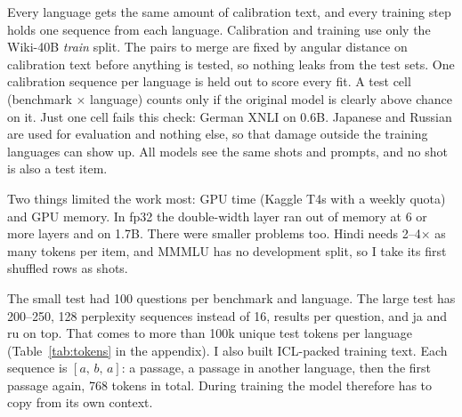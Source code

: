 \documentclass[11pt]{article}
\begin{document}
\begin{table}[t]
\centering\small
{}
\caption{Data. Tests are never used for fitting or choosing anything. MGSM has no Hindi; INCLUDE has no English.}
\label{tab:data}
\end{table}

Every language gets the same amount of calibration text, and every training step holds one sequence from each
language. Calibration and training use only the Wiki-40B \emph{train} split. The pairs to merge are fixed by angular
distance on calibration text before anything is tested, so nothing leaks from the test sets. One calibration
sequence per language is held out to score every fit. A test cell (benchmark $\times$ language) counts only if the
original model is clearly above chance on it. Just one cell fails this check: German XNLI on 0.6B. Japanese and
Russian are used for evaluation and nothing else, so that damage outside the training languages can show up. All
models see the same shots and prompts, and no shot is also a test item.

Two things limited the work most: GPU time (Kaggle T4s with a weekly quota) and GPU memory. In fp32 the double-width
layer ran out of memory at 6 or more layers and on 1.7B. There were smaller problems too. Hindi needs 2--4$\times$ as
many tokens per item, and MMMLU has no development split, so I take its first shuffled rows as shots.

The small test had 100 questions per benchmark and language. The large test has 200--250, 128 perplexity sequences
instead of 16, results per question, and ja and ru on top. That comes to more than 100k unique test tokens per
language (Table~\ref{tab:tokens} in the appendix). I also built ICL-packed training text. Each sequence is
$[a,\,b,\,a]$: a passage, a passage in another language, then the first passage again, 768 tokens in total. During
training the model therefore has to copy from its own context.
\end{document}
